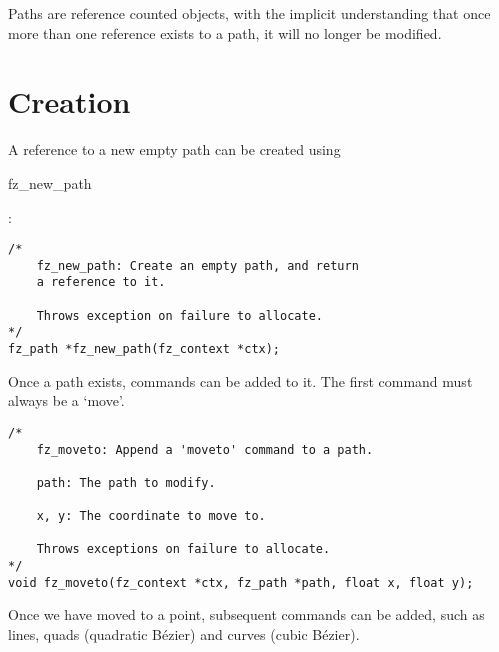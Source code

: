 \documentclass[oneside]{book}
\begin{document}
Paths are reference counted objects, with the implicit understanding that once more than one reference exists to a path, it will no longer be modified.

\section{Creation}
\label{PathCreation}

A reference to a new empty path can be created using \begin{tt}fz\_new\_path\end{tt}:

\begin{lstlisting}
/*
	fz_new_path: Create an empty path, and return
	a reference to it.

	Throws exception on failure to allocate.
*/
fz_path *fz_new_path(fz_context *ctx);
\end{lstlisting}

Once a path exists, commands can be added to it. The first command must always be a `move'.

\begin{lstlisting}
/*
	fz_moveto: Append a 'moveto' command to a path.

	path: The path to modify.

	x, y: The coordinate to move to.

	Throws exceptions on failure to allocate.
*/
void fz_moveto(fz_context *ctx, fz_path *path, float x, float y);
\end{lstlisting}

Once we have moved to a point, subsequent commands can be added, such as lines, quads (quadratic Bézier) and curves (cubic Bézier).
\end{document}
